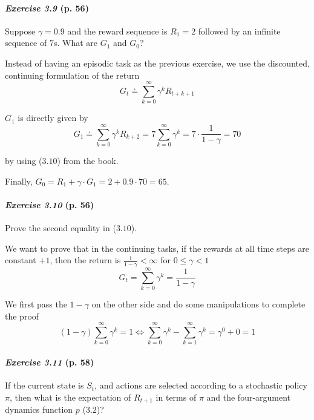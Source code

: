 \documentclass[10pt,a4paper]{article}
\begin{document}
\paragraph{\textit{Exercise 3.9} (p. 56)} Suppose $\gamma = 0.9$ and the reward sequence is $R_1 = 2$ followed by an infinite sequence of $7$s. What are $G_1$ and $G_0$?

\bigskip
Instead of having an episodic task as the previous exercise, we use the discounted, continuing formulation of the return
\begin{equation}
G_t \doteq \sum_{k=0}^\infty \gamma^k R_{t+k+1}
\end{equation}

$G_1$ is directly given by
\begin{equation}
G_1 \doteq \sum_{k=0}^\infty \gamma^k R_{k+2} = 7 \sum_{k=0}^\infty \gamma^k = 7 \cdot \frac{1}{1-\gamma} = 70
\end{equation}

by using ($3.10$) from the book.

Finally, $G_0 = R_1 + \gamma \cdot G_1 = 2 + 0.9 \cdot 70 = 65$.


\paragraph{\textit{Exercise 3.10} (p. 56)} Prove the second equality in ($3.10$).

\bigskip
We want to prove that in the continuing tasks, if the rewards at all time steps are constant $+1$, then the return is $\frac{1}{1-\gamma} < \infty$ for $0 \leq \gamma < 1$
\begin{equation}
G_t =\sum_{k=0}^\infty \gamma^k = \frac{1}{1-\gamma}
\end{equation}

We first pass the $1-\gamma$ on the other side and do some manipulations to complete the proof
\begin{equation}
(1-\gamma) \sum_{k=0}^\infty \gamma^k = 1 \iff \sum_{k=0}^\infty \gamma^k - \sum_{k=1}^\infty \gamma^{k} = \gamma^0 + 0 = 1
\end{equation}

\paragraph{\textit{Exercise 3.11} (p. 58)} If the current state is $S_t$, and actions are selected according to a stochastic
policy $\pi$, then what is the expectation of $R_{t+1}$ in terms of $\pi$ and the four-argument dynamics function $p$ ($3.2$)?
\end{document}
